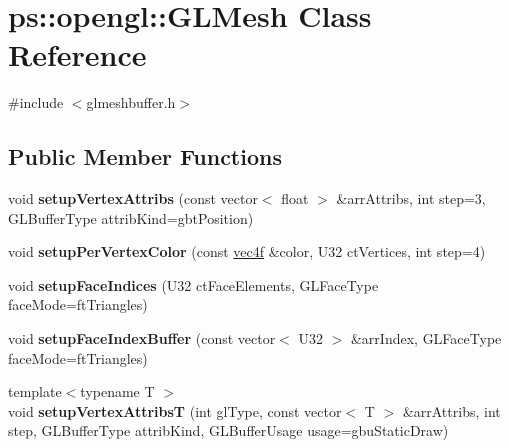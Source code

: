 \hypertarget{classps_1_1opengl_1_1GLMesh}{}\section{ps\+:\+:opengl\+:\+:G\+L\+Mesh Class Reference}
\label{classps_1_1opengl_1_1GLMesh}


{\ttfamily \#include $<$glmeshbuffer.\+h$>$}

\subsection*{Public Member Functions}
\begin{DoxyCompactItemize}
\item 
\hypertarget{classps_1_1opengl_1_1GLMesh_a8f24ba9a17b57f5a92aed63ae049dc68}{}void {\bfseries setup\+Vertex\+Attribs} (const vector$<$ float $>$ \&arr\+Attribs, int step=3, G\+L\+Buffer\+Type attrib\+Kind=gbt\+Position)\label{classps_1_1opengl_1_1GLMesh_a8f24ba9a17b57f5a92aed63ae049dc68}

\item 
\hypertarget{classps_1_1opengl_1_1GLMesh_a6e530628b25140366b442e314cf701a0}{}void {\bfseries setup\+Per\+Vertex\+Color} (const \hyperlink{classps_1_1base_1_1Vec4}{vec4f} \&color, U32 ct\+Vertices, int step=4)\label{classps_1_1opengl_1_1GLMesh_a6e530628b25140366b442e314cf701a0}

\item 
\hypertarget{classps_1_1opengl_1_1GLMesh_a3d9fb6b505824b6b5fde7eaa56ecf219}{}void {\bfseries setup\+Face\+Indices} (U32 ct\+Face\+Elements, G\+L\+Face\+Type face\+Mode=ft\+Triangles)\label{classps_1_1opengl_1_1GLMesh_a3d9fb6b505824b6b5fde7eaa56ecf219}

\item 
\hypertarget{classps_1_1opengl_1_1GLMesh_a4b980b340dfc1c734c8e986fbaf007ad}{}void {\bfseries setup\+Face\+Index\+Buffer} (const vector$<$ U32 $>$ \&arr\+Index, G\+L\+Face\+Type face\+Mode=ft\+Triangles)\label{classps_1_1opengl_1_1GLMesh_a4b980b340dfc1c734c8e986fbaf007ad}

\item 
\hypertarget{classps_1_1opengl_1_1GLMesh_a2bb37434c68fe755015c1716b3d51457}{}{\footnotesize template$<$typename T $>$ }\\void {\bfseries setup\+Vertex\+Attribs\+T} (int gl\+Type, const vector$<$ T $>$ \&arr\+Attribs, int step, G\+L\+Buffer\+Type attrib\+Kind, G\+L\+Buffer\+Usage usage=gbu\+Static\+Draw)\label{classps_1_1opengl_1_1GLMesh_a2bb37434c68fe755015c1716b3d51457}


\end{DoxyCompactItemize}
